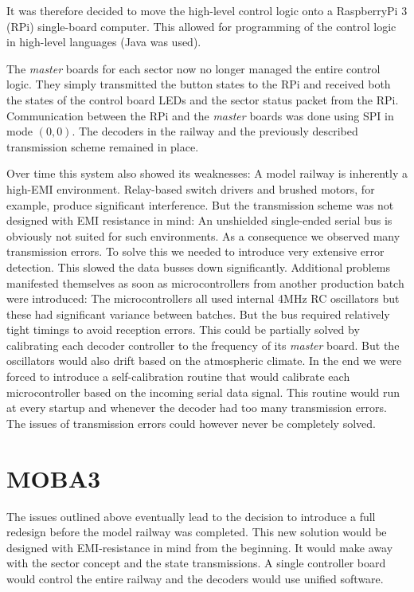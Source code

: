 \documentclass{scrreprt}
\begin{document}
It was therefore decided to move the high-level control logic onto a RaspberryPi 3 (RPi) single-board computer.
This allowed for programming of the control logic in high-level languages (Java was used).

The \emph{master} boards for each sector now no longer managed the entire control logic.
They simply transmitted the button states to the RPi and received both the states of the control board LEDs and the sector status packet from the RPi.
Communication between the RPi and the \emph{master} boards was done using SPI in mode $(0,0)$.
The decoders in the railway and the previously described transmission scheme remained in place.

Over time this system also showed its weaknesses:
A model railway is inherently a high-EMI environment.
Relay-based switch drivers and brushed motors, for example, produce significant interference.
But the transmission scheme was not designed with EMI resistance in mind:
An unshielded single-ended serial bus is obviously not suited for such environments.
As a consequence we observed many transmission errors.
To solve this we needed to introduce very extensive error detection.
This slowed the data busses down significantly.
Additional problems manifested themselves as soon as microcontrollers from another production batch were introduced:
The microcontrollers all used internal 4MHz RC oscillators but these had significant variance between batches.
But the bus required relatively tight timings to avoid reception errors.
This could be partially solved by calibrating each decoder controller to the frequency of its \emph{master} board.
But the oscillators would also drift based on the atmospheric climate.
In the end we were forced to introduce a self-calibration routine that would calibrate each microcontroller based on the incoming serial data signal.
This routine would run at every startup and whenever the decoder had too many transmission errors.
The issues of transmission errors could however never be completely solved.

\section{MOBA3}
The issues outlined above eventually lead to the decision to introduce a full redesign before the model railway was completed.
This new solution would be designed with EMI-resistance in mind from the beginning.
It would make away with the sector concept and the state transmissions.
A single controller board would control the entire railway and the decoders would use unified software.
\end{document}

